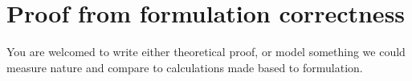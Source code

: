 %
%
%
\begin{comment}\end{comment}
\chapter{Proof from formulation correctness}

You are welcomed to write either theoretical proof, or model something we could
measure nature and compare to calculations made based to formulation.



\begin{comment}\end{comment}

